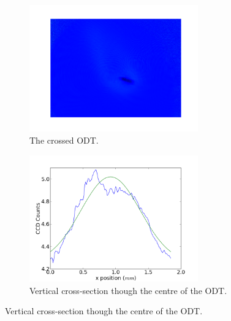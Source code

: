 \begin{figure}[h]
\centering
    \begin{subfigure}[b]{0.5\textwidth}
        \centering
        \includegraphics[width=0.8\textwidth]{figs/ODTimage1.png}
        \caption{The crossed ODT.}
    \end{subfigure}\begin{subfigure}[b]{0.5\textwidth}
        \centering
        \includegraphics[width=0.8\textwidth]{figs/ODTimage1x.png}
        \caption{Vertical cross-section though the centre of the ODT.}
    \end{subfigure}


\end{figure}
